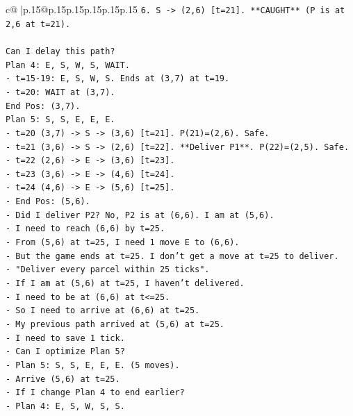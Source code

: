 \documentclass{article}
\begin{document}
{\begin{supertabular}{c@{$\;$}|p{.15\linewidth}@{}p{.15\linewidth}p{.15\linewidth}p{.15\linewidth}p{.15\linewidth}p{.15\linewidth}}
{{{\texttt{6. S {-}> (2,6) {[}t=21{]}. **CAUGHT** (P is at 2,6 at t=21).} \\
\\ 
\texttt{Can I delay this path?} \\
\texttt{Plan 4: E, S, W, S, WAIT.} \\
\texttt{{-} t=15{-}19: E, S, W, S. Ends at (3,7) at t=19.} \\
\texttt{{-} t=20: WAIT at (3,7).} \\
\texttt{End Pos: (3,7).} \\
\texttt{Plan 5: S, S, E, E, E.} \\
\texttt{{-} t=20 (3,7) {-}> S {-}> (3,6) {[}t=21{]}. P(21)=(2,6). Safe.} \\
\texttt{{-} t=21 (3,6) {-}> S {-}> (2,6) {[}t=22{]}. **Deliver P1**. P(22)=(2,5). Safe.} \\
\texttt{{-} t=22 (2,6) {-}> E {-}> (3,6) {[}t=23{]}.} \\
\texttt{{-} t=23 (3,6) {-}> E {-}> (4,6) {[}t=24{]}.} \\
\texttt{{-} t=24 (4,6) {-}> E {-}> (5,6) {[}t=25{]}.} \\
\texttt{{-} End Pos: (5,6).} \\
\texttt{{-} Did I deliver P2? No, P2 is at (6,6). I am at (5,6).} \\
\texttt{{-} I need to reach (6,6) by t=25.} \\
\texttt{{-} From (5,6) at t=25, I need 1 move E to (6,6).} \\
\texttt{{-} But the game ends at t=25. I don't get a move at t=25 to deliver.} \\
\texttt{{-} "Deliver every parcel within 25 ticks".} \\
\texttt{{-} If I am at (5,6) at t=25, I haven't delivered.} \\
\texttt{{-} I need to be at (6,6) at t<=25.} \\
\texttt{{-} So I need to arrive at (6,6) at t=25.} \\
\texttt{{-} My previous path arrived at (5,6) at t=25.} \\
\texttt{{-} I need to save 1 tick.} \\
\texttt{{-} Can I optimize Plan 5?} \\
\texttt{{-} Plan 5: S, S, E, E, E. (5 moves).} \\
\texttt{{-} Arrive (5,6) at t=25.} \\
\texttt{{-} If I change Plan 4 to end earlier?} \\
\texttt{{-} Plan 4: E, S, W, S, S.} \\
}}}
\end{supertabular}}
\end{document}
